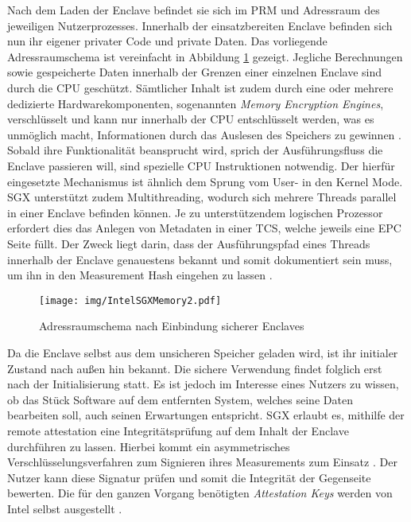 Nach dem Laden der Enclave befindet sie sich im \ac{PRM} und Adressraum des jeweiligen Nutzerprozesses. Innerhalb der einsatzbereiten Enclave befinden sich nun ihr eigener privater Code und private Daten. Das vorliegende Adressraumschema ist vereinfacht in Abbildung \ref{fig:intelsgxmemory2} gezeigt. Jegliche Berechnungen sowie gespeicherte Daten innerhalb der Grenzen einer einzelnen Enclave sind durch die \ac{CPU} geschützt. Sämtlicher Inhalt ist zudem durch eine oder mehrere dedizierte Hardwarekomponenten, sogenannten \textit{Memory Encryption Engines}, verschlüsselt und kann nur innerhalb der \ac{CPU} entschlüsselt werden, was es unmöglich macht, Informationen durch das Auslesen des Speichers zu gewinnen \cite{McKeen2013}. Sobald ihre Funktionalität beansprucht wird, sprich der Ausführungsfluss die Enclave passieren will, sind spezielle \ac{CPU} Instruktionen notwendig. Der hierfür eingesetzte Mechanismus ist ähnlich dem Sprung vom User- in den Kernel Mode. \ac{SGX} unterstützt zudem Multithreading, wodurch sich mehrere Threads parallel in einer Enclave befinden können. Je zu unterstützendem logischen Prozessor erfordert dies das Anlegen von Metadaten in einer \ac{TCS}, welche jeweils eine \ac{EPC} Seite füllt. Der Zweck liegt darin, dass der Ausführungspfad eines Threads innerhalb der Enclave genauestens bekannt und somit dokumentiert sein muss, um ihn in den Measurement Hash eingehen zu lassen \cite{McKeen2013}.

\begin{figure}
	\texttt{[image: img/IntelSGXMemory2.pdf]}
	\centering
	\caption{Adressraumschema nach Einbindung sicherer Enclaves}
	\label{fig:intelsgxmemory2}
\end{figure}

Da die Enclave selbst aus dem unsicheren Speicher geladen wird, ist ihr initialer Zustand nach außen hin bekannt. Die sichere Verwendung findet folglich erst nach der Initialisierung statt. Es ist jedoch im Interesse eines Nutzers zu wissen, ob das Stück Software auf dem entfernten System, welches seine Daten bearbeiten soll, auch seinen Erwartungen entspricht. \ac{SGX} erlaubt es, mithilfe der remote attestation eine Integritätsprüfung auf dem Inhalt der Enclave durchführen zu lassen. Hierbei kommt ein asymmetrisches Verschlüsselungsverfahren zum Signieren ihres Measurements zum Einsatz \cite{Costan2016}. Der Nutzer kann diese Signatur prüfen und somit die Integrität der Gegenseite bewerten. Die für den ganzen Vorgang benötigten \textit{Attestation Keys} werden von Intel selbst ausgestellt \cite{Johnson2016}.

